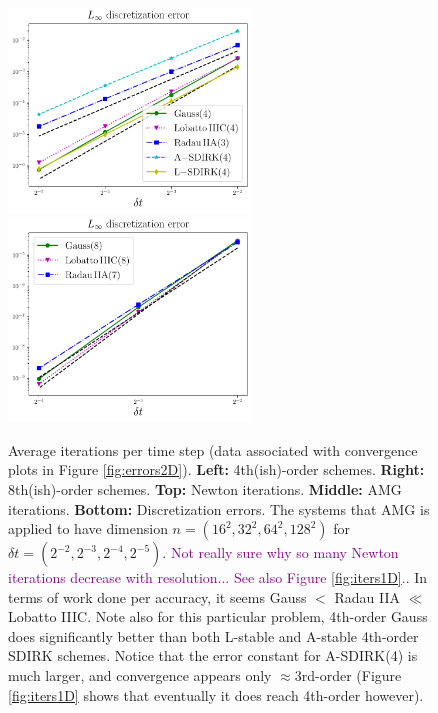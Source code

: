 \documentclass[review]{siamart}
\newcommand{\tcp}{\textcolor{purple}}
\begin{document}
\begin{figure}[H]
{}
\centerline{
\includegraphics[width = 0.575\textwidth]{figures/errors_O4_dim2}
\quad
\includegraphics[width = 0.575\textwidth]{figures/errors_O7_dim2}
}
\caption{Average iterations per time step (data associated with convergence plots in Figure \ref{fig:errors2D}). \textbf{Left:} 4th(ish)-order schemes. \textbf{Right:} 8th(ish)-order schemes. \textbf{Top:} Newton iterations. \textbf{Middle:} AMG iterations. \textbf{Bottom:} Discretization errors. The systems that AMG is applied to have dimension $n = (16^2, 32^2, 64^2, 128^2)$ for $\delta t = (2^{-2}, 2^{-3}, 2^{-4}, 2^{-5})$. \tcp{Not really sure why so many Newton iterations decrease with resolution... See also Figure \ref{fig:iters1D}.}. In terms of work done per accuracy, it seems Gauss $<$ Radau IIA $\ll$ Lobatto IIIC. Note also for this particular problem, 4th-order Gauss does significantly better than both L-stable and A-stable 4th-order SDIRK schemes. Notice that the error constant for A-SDIRK(4) is much larger, and convergence appears only $\approx$3rd-order (Figure \ref{fig:iters1D} shows that eventually it does reach 4th-order however).
\label{fig:iters2D}
}
\end{figure}
\end{document}
